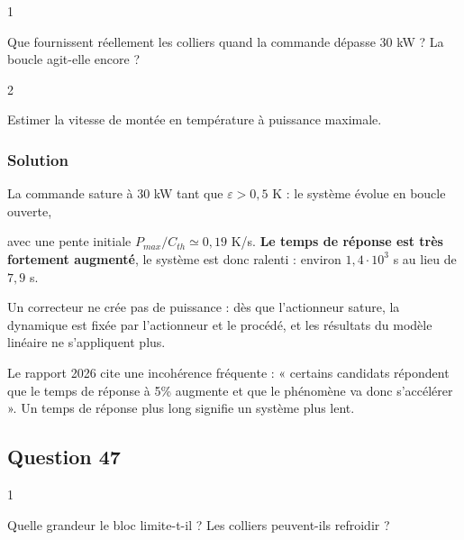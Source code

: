 \documentclass[11pt,a4paper]{article}
\newcommand{\equationajustee}[1]{%
  \sbox{\boiteequation}{$\displaystyle #1$}%
  \ifdim\wd\boiteequation>\linewidth
    \[\resizebox{\linewidth}{!}{\usebox{\boiteequation}}\]%
  \else
    \[#1\]%
  \fi}
\begin{document}
\begin{indication}{1}

Que fournissent réellement les colliers quand la commande dépasse 30 kW ? La boucle agit-elle encore ?

\end{indication}

\begin{indication}{2}

Estimer la vitesse de montée en température à puissance maximale.

\end{indication}

\hypertarget{solution-45}{%
\subsubsection{Solution}\label{solution-45}}

La commande sature à 30 kW tant que \(\varepsilon>0{,}5\) K : le système évolue en boucle ouverte,

\equationajustee{\Delta\theta(t)=R_{th}P_{max}(1-e^{-t/\tau})}

avec une pente initiale \(P_{max}/C_{th}\simeq0{,}19\) K/s. \textbf{Le temps de réponse est très fortement augmenté}, le système est donc ralenti : environ \(1{,}4\cdot10^3\) s au lieu de \(7{,}9\) s.

\begin{methode}

Un correcteur ne crée pas de puissance : dès que l'actionneur sature, la dynamique est fixée par l'actionneur et le procédé, et les résultats du modèle linéaire ne s'appliquent plus.

\end{methode}

\begin{piege}

Le rapport 2026 cite une incohérence fréquente : « certains candidats répondent que le temps de réponse à 5\% augmente et que le phénomène va donc s'accélérer ». Un temps de réponse plus long signifie un système plus lent.

\end{piege}

\hypertarget{question-47}{%
\subsection{Question 47}\label{question-47}}

\begin{indication}{1}

Quelle grandeur le bloc limite-t-il ? Les colliers peuvent-ils refroidir ?

\end{indication}
\end{document}
